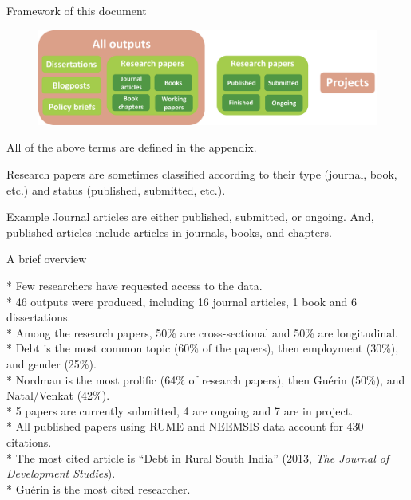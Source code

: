 \documentclass[aspectratio=169]{beamer}
\begin{document}
\begin{frame}{Framework of this document}
\label{framework}
\begin{small}

\begin{figure}[h]
\centering
\includegraphics[width=0.7\columnwidth]{INPUT/diagram.png}
\end{figure}

All of the above terms are defined in the appendix. \hyperlink{appendix}{}

Research papers are sometimes classified according to their type (journal, book, etc.) and status (published, submitted, etc.).

\begin{scriptsize}
\begin{greenbox}{Example}
Journal articles are either published, submitted, or ongoing. And, published articles include articles in journals, books, and chapters.
\end{greenbox}
\end{scriptsize}

\end{small}
\end{frame}





\begin{frame}{A brief overview}
\begin{scriptsize}

\begin{brickbox}
* Few researchers have requested access to the data. \\
* 46 outputs were produced, including 16 journal articles, 1 book and 6 dissertations. \\
* Among the research papers, 50\% are cross-sectional and 50\% are longitudinal. \\
* Debt is the most common topic (60\% of the papers), then employment (30\%), and gender (25\%). \\
* Nordman is the most prolific (64\% of research papers), then Guérin (50\%), and Natal/Venkat (42\%). \\
* 5 papers are currently submitted, 4 are ongoing and 7 are in project. \\
* All published papers using RUME and NEEMSIS data account for 430 citations. \\
* The most cited article is ``Debt in Rural South India'' (2013, \textit{The Journal of Development Studies}). \\
* Guérin is the most cited researcher.
\end{brickbox}

\end{scriptsize}
\end{frame}
\end{document}
